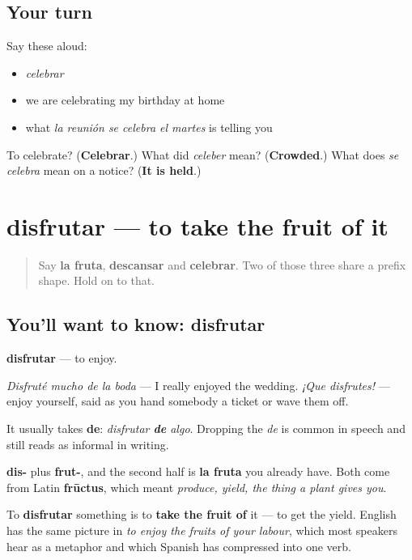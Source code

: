 \subsection*{Your turn}
Say these aloud:

\begin{itemize}
\raggedright
  \item \emph{celebrar}
  \item we are celebrating my birthday at home
  \item what \emph{la reunión se celebra el martes} is telling you
\end{itemize}

\begin{tcolorbox}[breakable,colback=teal!4,colframe=teal!35!black,title={Before you move on}]
To celebrate? (\textbf{Celebrar}.) What did \emph{celeber} mean? (\textbf{Crowded}.) What does \emph{se celebra} mean on a notice? (\textbf{It is held}.)
\end{tcolorbox}
\section[disfrutar]{disfrutar — to take the fruit of it}

\label{lesson:ES-C440-disfrutar}



\begin{quote}
Say \textbf{la fruta}, \textbf{descansar} and \textbf{celebrar}. Two of those three share a prefix shape. Hold on to that.
\end{quote}

\subsection*{You'll want to know: disfrutar}
\textbf{disfrutar} — to enjoy.

\emph{Disfruté mucho de la boda} — I really enjoyed the wedding. \emph{¡Que disfrutes!} — enjoy yourself, said as you hand somebody a ticket or wave them off.

It usually takes \textbf{de}: \emph{disfrutar \textbf{de} algo}. Dropping the \emph{de} is common in speech and still reads as informal in writing.

\begin{cousinweb}
\textbf{dis-} plus \textbf{frut-}, and the second half is \textbf{la fruta} you already have. Both come from Latin \textbf{frūctus}, which meant \emph{produce, yield, the thing a plant gives you}.

To \textbf{disfrutar} something is to \textbf{take the fruit of} it — to get the yield. English has the same picture in \emph{to enjoy the fruits of your labour}, which most speakers hear as a metaphor and which Spanish has compressed into one verb.
\end{cousinweb}

